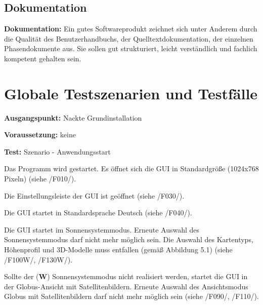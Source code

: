 \documentclass[10pt]{scrreprt}
\newcommand{\sfbf}[1]{\textbf{\sffamily #1}}
\newcommand{\W}{\sfbf{W}}
\newcommand{\ziel}[1]{{\fontsize{9.5}{11}\textsf{/#1/}}}
\newcommand{\ziellabel}{Z}
\newcommand{\muss}{\renewcommand{\labelenumi}{\textbf{\ziel{\ziellabel\numprint{\theenumi}0}}}}
\newcommand{\wunsch}{\renewcommand{\labelenumi}{\textbf{\ziel{\ziellabel\numprint{\theenumi}0W}}}}
\newenvironment{details}[1][6pt]{%
  \parskip#1 \parindent6mm \raggedright%
  \def\item{\par\ignorespaces\hangindent=5mm \hangafter1}}{%
  \par\ignorespaces}
\begin{document}
\section*{Dokumentation}
\begin{details}
\item \sfbf{Dokumentation:} Ein gutes Softwareprodukt zeichnet sich unter Anderem durch die Qualität des Benutzerhandbuchs, der Quelltextdokumentation, der einzelnen Phasendokumente aus. Sie sollen gut strukturiert, leicht verständlich und fachlich kompetent gehalten sein. 
\end{details}




\chapter{Globale Testszenarien und Testfälle}

\renewcommand{\ziellabel}{T}

\begin{details}[2pt]
\item \sfbf{Ausgangspunkt:} Nackte Grundinstallation 
\item \sfbf{Voraussetzung:} keine
\item \sfbf{Test:} Szenario - Anwendungsstart
\end{details}
\vspace{2mm}
\begin{enumerate}[leftmargin = 2.2cm]
\item Das Programm wird gestartet. Es öffnet sich die GUI in Standardgröße (1024x768 Pixeln) (siehe \ziel{F010}).
\item Die Einstellungsleiste der GUI ist geöffnet (siehe \ziel{F030}).
\item Die GUI startet in Standardsprache Deutsch (siehe \ziel{F040}).
\wunsch
\item Die GUI startet im Sonnensystemmodus. Erneute Auswahl des Sonnensystemmodus darf nicht mehr möglich sein. Die Auswahl des Kartentyps, Höhenprofil und 3D-Modelle muss entfallen (gemäß Abbildung 5.1) (siehe \ziel{F100W}, \ziel{F130W}).
\muss
\item Sollte der (\W) Sonnensystemmodus nicht realisiert werden, startet die GUI in der Globus-Ansicht mit Satellitenbildern. Erneute Auswahl des Ansichtsmodus Globus mit Satellitenbildern darf nicht mehr möglich sein (siehe \ziel{F090}, \ziel{F110}).
\end{enumerate}
\end{document}
